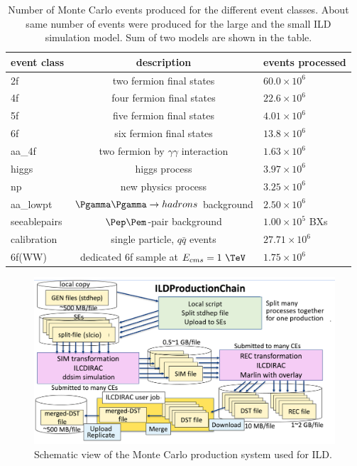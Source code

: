 \begin{table}[htbp]
\renewcommand{\arraystretch}{1.25}

\centering\small
\begin{tabular}{lcl}
\hline
 event class  &  description & events processed \\ 
\hline 
2f &   two fermion  final states &  $60.0 \times 10^6$ \\
4f &  four fermion final states & $22.6 \times 10^6$ \\
5f &  five fermion final states & $4.01 \times 10^6$ \\
6f &   six fermion  final states &  $13.8 \times 10^6$ \\
aa\_4f & two fermion by $\gamma\gamma$ interaction & $1.63 \times 10^6$ \\
higgs & higgs process & $3.97 \times 10^6$ \\
np & new physics process & $3.25 \times 10^6$ \\
\hline
aa\_lowpt &  $\Pgamma \Pgamma \to hadrons$ background  &  $2.50 \times 10^6$ \\
seeablepairs &   $\Pep\Pem$-pair background    &  $1.00\times 10^5$ BXs \\
calibration & single particle, $q\bar{q}$ events & $27.71\times 10^6$ \\
\hline
6f(WW) &  dedicated 6f sample at $E_{cms}=1~\TeV$ &  $1.75 \times 10^6$ \\

\hline
\end{tabular}
\caption{Number of Monte Carlo events produced for the different event classes. 
About same number of events were produced for the large and the small ILD simulation model.
Sum of two models are shown in the table.} 
\end{table}



\begin{figure}[b!]
\includegraphics[width=1.0\hsize]{Modelling/fig/ilcdirac_ild_scheme.png}
\caption{\label{fig:sim_ild_mcprod} Schematic view of the Monte Carlo production system used for ILD.}
\end{figure}

